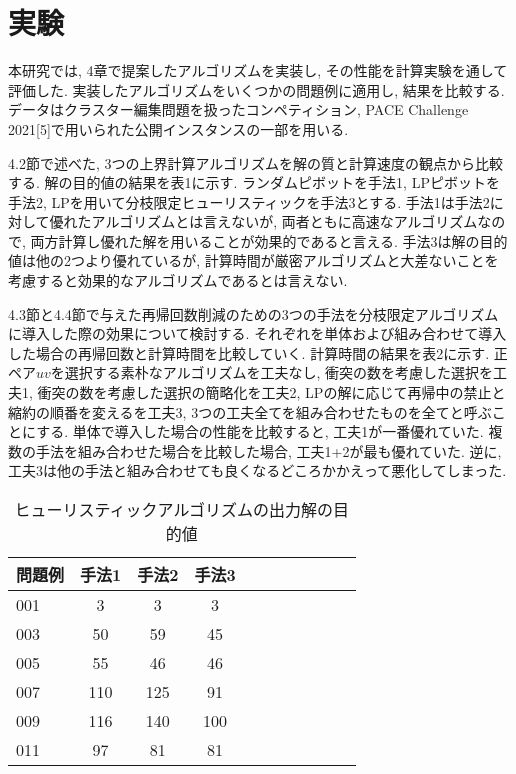 \documentclass[10pt,a4j,twocolumn, dvipdfmx]{bxjsarticle}
\begin{document}
\section{実験}
本研究では, 4章で提案したアルゴリズムを実装し, その性能を計算実験を通して評価した.
実装したアルゴリズムをいくつかの問題例に適用し, 結果を比較する.
データはクラスター編集問題を扱ったコンペティション, PACE Challenge 2021[5]で用いられた公開インスタンスの一部を用いる.\par
4.2節で述べた, 3つの上界計算アルゴリズムを解の質と計算速度の観点から比較する.
解の目的値の結果を表1に示す. ランダムピボットを手法1, LPピボットを手法2, LPを用いて分枝限定ヒューリスティックを手法3とする.
手法1は手法2に対して優れたアルゴリズムとは言えないが, 両者ともに高速なアルゴリズムなので, 両方計算し優れた解を用いることが効果的であると言える.
手法3は解の目的値は他の2つより優れているが, 計算時間が厳密アルゴリズムと大差ないことを考慮すると効果的なアルゴリズムであるとは言えない.\par

4.3節と4.4節で与えた再帰回数削減のための3つの手法を分枝限定アルゴリズムに導入した際の効果について検討する.
それぞれを単体および組み合わせて導入した場合の再帰回数と計算時間を比較していく.
計算時間の結果を表2に示す.
正ペア$uv$を選択する素朴なアルゴリズムを工夫なし, 衝突の数を考慮した選択を工夫1, 衝突の数を考慮した選択の簡略化を工夫2, LPの解に応じて再帰中の禁止と縮約の順番を変えるを工夫3, 3つの工夫全てを組み合わせたものを全てと呼ぶことにする.
単体で導入した場合の性能を比較すると, 工夫1が一番優れていた.
複数の手法を組み合わせた場合を比較した場合, 工夫1+2が最も優れていた.
逆に, 工夫3は他の手法と組み合わせても良くなるどころかかえって悪化してしまった.

\begin{table}[H]
    \caption{ヒューリスティックアルゴリズムの出力解の目的値}
    \label{table:data_type}
    \centering
    \begin{tabular}{l|cccccccccr}
        \hline
        問題例  & 手法1 &  手法2 & 手法3\\
        \hline
        001  & 3  & 3  & 3\\
        003 & 50 & 59 & 45\\
        005 & 55 & 46 & 46\\
        007 & 110 & 125 & 91\\
        009 & 116 & 140 & 100\\
        011 & 97 & 81 & 81\\
        \hline
    \end{tabular}
\end{table}
\end{document}
